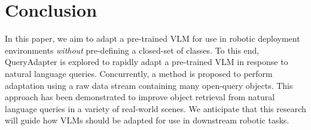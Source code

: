\vspace{-0.3em}
\section{Conclusion}
In this paper, we aim to adapt a pre-trained VLM for use in robotic deployment environments \textit{without} pre-defining a closed-set of classes. To this end, QueryAdapter is explored to rapidly adapt a pre-trained VLM in response to natural language queries. Concurrently, a method is proposed to perform adaptation using a raw data stream containing many open-query objects. This approach has been demonstrated to improve object retrieval from natural language queries in a variety of real-world scenes. We anticipate that this research will guide how VLMs should be adapted for use in downstream robotic tasks.